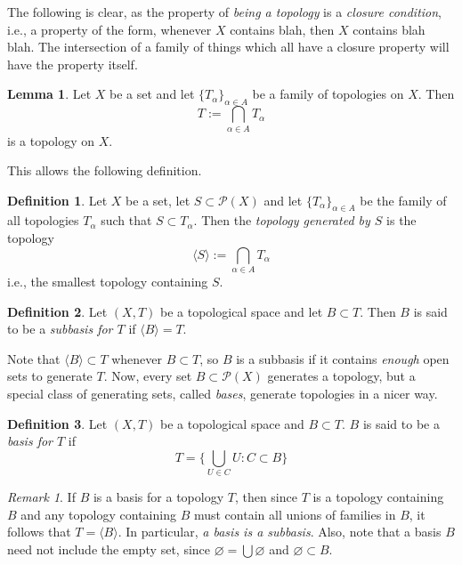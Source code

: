 \documentclass{book}
\theoremstyle{definition}
\newtheorem{lemma}[theorem]{Lemma}
\newtheorem{definition}{Definition}[section]
\theoremstyle{remark}
\newtheorem{remark}{Remark}[section]
\begin{document}
The following is clear, as the property of \textit{being a topology} is a \textit{closure condition}, i.e., a property of the form, whenever $X$ contains blah, then $X$ contains blah blah. The intersection of a family of things which all have a closure property will have the property itself.
\begin{lemma}
Let $X$ be a set and let $\{T_\alpha\}_{\alpha\in A}$ be a family of topologies on $X$. Then
$$T:=\bigcap_{\alpha\in A} T_\alpha$$
is a topology on $X$.
\end{lemma}

This allows the following definition.
\begin{definition}
Let $X$ be a set, let $S\subset\mathcal P(X)$ and let $\{T_\alpha\}_{\alpha\in A}$ be the family of all topologies $T_\alpha$ such that $S\subset T_\alpha$. Then the \textit{topology generated by $S$} is the topology
$$\langle S\rangle :=\bigcap_{\alpha\in A} T_\alpha$$
i.e., the smallest topology containing $S$.
\end{definition}

\begin{definition}
Let $(X,T)$ be a topological space and let $B\subset T$. Then $B$ is said to be a \textit{subbasis for $T$} if $\langle B\rangle=T$.
\end{definition}

Note that $\langle B\rangle\subset T$ whenever $B\subset T$, so $B$ is a subbasis if it contains \textit{enough} open sets to generate $T$. Now, every set $B\subset\mathcal P(X)$ generates a topology, but a special class of generating sets, called \textit{bases}, generate topologies in a nicer way.

\begin{definition}
Let $(X,T)$ be a topological space and $B\subset T$. $B$ is said to be a \textit{basis for $T$} if
$$T=\bigg\{\bigcup_{U\in C} U : C\subset B\bigg\}$$
\end{definition}
\begin{remark}
If $B$ is a basis for a topology $T$, then since $T$ is a topology containing $B$ and any topology containing $B$ must contain all unions of families in $B$, it follows that $T=\langle B\rangle$. In particular, \textit{a basis is a subbasis}. Also, note that a basis $B$ need not include the empty set, since $\varnothing=\bigcup\varnothing$ and $\varnothing\subset B$.
\end{remark}
\end{document}
